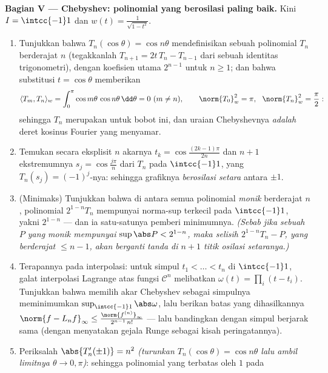 \begin{problem}
\medskip
\noindent\textbf{Bagian V --- Chebyshev: polinomial yang
berosilasi paling baik.} Kini $I = \intcc{-1}1$ dan $w(t) =
\frac1{\sqrt{1 - t^2}}$.
\begin{enumerate}[resume]
  \item Tunjukkan bahwa $T_n(\cos\theta) = \cos n\theta$ mendefinisikan sebuah
        polinomial $T_n$ berderajat $n$ (tegakkanlah $T_{n+1} =
        2t\,T_n - T_{n-1}$ dari sebuah identitas trigonometri),
        dengan koefisien utama $2^{n-1}$ untuk $n \geq 1$;
        dan bahwa substitusi $t = \cos\theta$ memberikan
        \[
        \langle T_m, T_n\rangle_w =
        \int_0^\pi\cos m\theta\,\cos n\theta\,\dd\theta
        = 0 \ (m \neq n), \qquad
        \norm{T_0}_w^2 = \pi,\ \ \norm{T_n}_w^2 = \frac\pi2 :
        \]
        sehingga $T_n$ merupakan  untuk bobot
        ini, dan uraian Chebyshevnya \emph{adalah} deret kosinus
        Fourier yang menyamar.
  \item Temukan secara eksplisit $n$ akarnya $t_k =
        \cos\frac{(2k-1)\pi}{2n}$ dan $n + 1$ ekstremumnya
        $s_j = \cos\frac{j\pi}n$ dari $T_n$ pada $\intcc{-1}1$,
        yang $T_n(s_j) = (-1)^j$-nya: sehingga grafiknya
        \emph{berosilasi setara} antara $\pm1$.
  \item (Minimaks) Tunjukkan bahwa di antara semua polinomial \emph{monik}
        berderajat $n$, polinomial
        $2^{1-n}T_n$ mempunyai norma-sup terkecil pada
        $\intcc{-1}1$, yakni $2^{1-n}$ --- dan ia
        satu-satunya pemberi minimumnya. \emph{(Sebab jika sebuah $P$ yang monik mempunyai
        $\sup\abs P < 2^{1-n}$, maka selisih $2^{1-n}T_n -
        P$, yang berderajat $\leq n-1$, akan berganti tanda di
        $n+1$ titik osilasi setaranya.)}
  \item Terapannya pada interpolasi: untuk simpul $t_1 < \dots
        < t_n$ di $\intcc{-1}1$, galat interpolasi
        Lagrange atas fungsi $\mathcal C^n$ melibatkan
        $\omega(t) = \prod_i(t - t_i)$. Tunjukkan bahwa memilih
        akar Chebyshev sebagai simpulnya meminimumkan
        $\sup_{\intcc{-1}1}\abs\omega$, lalu berikan
        batas yang dihasilkannya $\norm{f -
        L_nf}_\infty \leq \frac{\norm{f^{(n)}}_\infty}
        {2^{n-1}\,n!}$ --- lalu bandingkan dengan simpul berjarak sama
        (dengan menyatakan gejala Runge sebagai kisah peringatannya).
  \item Periksalah $\abs{T_n'(\pm1)} = n^2$ \emph{(turunkan
        $T_n(\cos\theta) = \cos n\theta$ lalu ambil limitnya
        $\theta \to 0, \pi$)}: sehingga polinomial yang terbatas oleh $1$ pada

\end{enumerate}
\end{problem}
